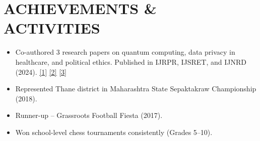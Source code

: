 \documentclass[letterpaper,11pt]{article}
\newcommand{\resumeItem}[1]{
  \item\small{
    {#1 \vspace{-1pt}}
  }
}
\newcommand{\resumeItemListStart}{\begin{itemize}[leftmargin=0.1in]}
\newcommand{\resumeItemListEnd}{\end{itemize}\vspace{-5pt}}
\begin{document}
\section{\color{airforceblue}ACHIEVEMENTS \& ACTIVITIES}
\resumeItemListStart
    \resumeItem{\normalsize{Co-authored 3 research papers on quantum computing, data privacy in healthcare, and political ethics. Published in IJRPR, IJSRET, and IJNRD (2024). \href{https://ijrpr.com/uploads/V5ISSUE3/IJRPR24368.pdf}{\color{blue}\underline{[1]}} \href{https://ijsret.com/wp-content/uploads/2024/05/IJSRET_V10_issue3_109.pdf}{\color{blue}\underline{[2]}} \href{https://www.ijnrd.org/papers/IJNRD2405315.pdf}{\color{blue}\underline{[3]}}}}
    \resumeItem{\normalsize{Represented Thane district in Maharashtra State Sepaktakraw Championship (2018).}}
    \resumeItem{\normalsize{Runner-up – Grassroots Football Fiesta (2017).}}
    \resumeItem{\normalsize{Won school-level chess tournaments consistently (Grades 5–10).}}
\resumeItemListEnd
\vspace{-10pt}
\end{document}
